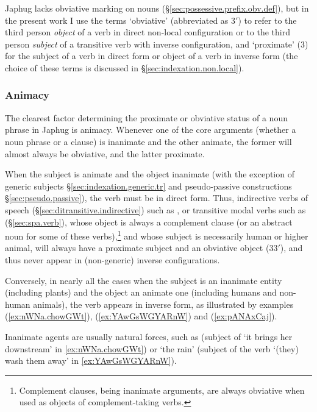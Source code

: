 Japhug lacks obviative marking on nouns (§\ref{sec:possessive.prefix.obv.def}), but in the present work I use the terms `obviative' (abbreviated as 3$'$) to refer to the third person \textit{object} of a verb in direct non-local configuration or to the third person \textit{subject} of a transitive verb with inverse configuration, and `proximate' (3) for the subject of a verb in direct form or object of a verb in inverse form (the choice of these terms is discussed in §\ref{sec:indexation.non.local}).
   
\subsubsection{Animacy}  \label{sec:obviation.animacy}
The clearest factor determining the proximate or obviative status of a noun phrase in Japhug is animacy. Whenever one of the core arguments (whether a noun phrase or a clause) is inanimate and the other animate, the former will almost always be obviative, and the latter proximate. 

When the subject is animate and the object inanimate (with the exception of generic subjects §\ref{sec:indexation.generic.tr} and pseudo-passive constructions §\ref{sec:pseudo.passive}), the verb must be in direct form. Thus, indirective verbs of speech (§\ref{sec:ditransitive.indirective}) such as , or transitive modal verbs such as  (§\ref{sec:spa.verb}), whose object is always a complement clause (or an abstract noun for some of these verbs),\footnote{Complement clauses, being inanimate arguments, are always obviative when used as objects of com\-ple\-ment-taking verbs. } and whose subject is necessarily human or higher animal, will always have a proximate subject and an obviative object (3\fl{}3$'$), and thus never appear in (non-generic) inverse configurations. 

Conversely, in nearly all the cases when the subject is an inanimate entity (including plants) and the object an animate one (including humans and non-human animals), the verb appears in inverse form, as illustrated by examples (\ref{ex:nWNa.chowGWt}), (\ref{ex:YAwGsWGYARnW}) and (\ref{ex:pANAxCaj}). 

Inanimate agents are usually natural forces, such as  (subject of  `it brings her downstream' in \ref{ex:nWNa.chowGWt}) or  `the rain'  (subject of the verb  `(they) wash them away' in \ref{ex:YAwGsWGYARnW}).   
 

